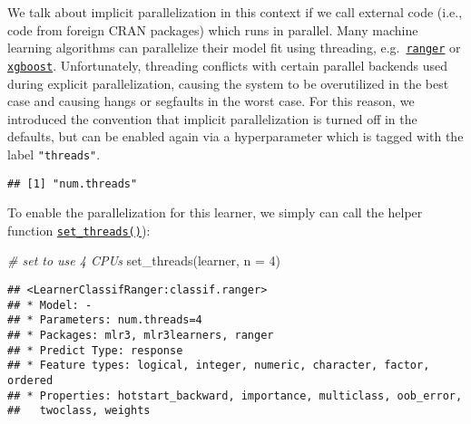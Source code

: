 \documentclass[
]{scrbook}
\newenvironment{Shaded}{\begin{snugshade}}{\end{snugshade}}
\newcommand{\AttributeTok}[1]{\textcolor[rgb]{0.77,0.63,0.00}{#1}}
\newcommand{\CommentTok}[1]{\textcolor[rgb]{0.56,0.35,0.01}{\textit{#1}}}
\newcommand{\DecValTok}[1]{\textcolor[rgb]{0.00,0.00,0.81}{#1}}
\newcommand{\FunctionTok}[1]{\textcolor[rgb]{0.00,0.00,0.00}{#1}}
\newcommand{\NormalTok}[1]{#1}
\newcommand{\OtherTok}[1]{\textcolor[rgb]{0.56,0.35,0.01}{#1}}
\newcommand{\SpecialCharTok}[1]{\textcolor[rgb]{0.00,0.00,0.00}{#1}}
\newcommand{\StringTok}[1]{\textcolor[rgb]{0.31,0.60,0.02}{#1}}
\renewenvironment{Shaded} {\begin{snugshade}\small} {\end{snugshade}}
\begin{document}
We talk about implicit parallelization in this context if we call external code (i.e., code from foreign CRAN packages) which runs in parallel.
Many machine learning algorithms can parallelize their model fit using threading, e.g.~\href{https://mlr3learners.mlr-org.com/reference/mlr_learners_classif.ranger.html}{\texttt{ranger}}
or \href{https://mlr3learners.mlr-org.com/reference/mlr_learners_classif.xgboost.html}{\texttt{xgboost}}.
Unfortunately, threading conflicts with certain parallel backends used during explicit parallelization, causing the system to be overutilized in the best case and causing hangs or segfaults in the worst case.
For this reason, we introduced the convention that implicit parallelization is turned off in the defaults, but can be enabled again via a hyperparameter which is tagged with the label \texttt{"threads"}.

\begin{Shaded}
\end{Shaded}

\begin{verbatim}
## [1] "num.threads"
\end{verbatim}

To enable the parallelization for this learner, we simply can call the helper function \href{https://mlr3.mlr-org.com/reference/set_threads.html}{\texttt{set\_threads()}}):

\begin{Shaded}
\begin{Highlighting}[]
\CommentTok{\# set to use 4 CPUs}
\FunctionTok{set\_threads}\NormalTok{(learner, }\AttributeTok{n =} \DecValTok{4}\NormalTok{)}
\end{Highlighting}
\end{Shaded}

\begin{verbatim}
## <LearnerClassifRanger:classif.ranger>
## * Model: -
## * Parameters: num.threads=4
## * Packages: mlr3, mlr3learners, ranger
## * Predict Type: response
## * Feature types: logical, integer, numeric, character, factor, ordered
## * Properties: hotstart_backward, importance, multiclass, oob_error,
##   twoclass, weights
\end{verbatim}
\end{document}
